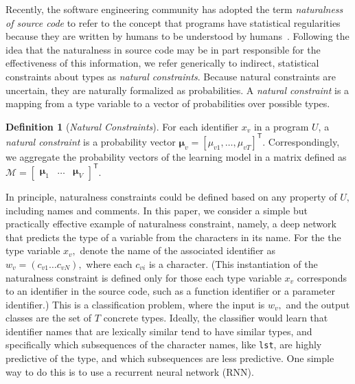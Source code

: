 \documentclass[sigplan,10pt,review,anonymous]{acmart}
\theoremstyle{plain}
\theoremstyle{remark}
\theoremstyle{definition}
\newtheorem{defn}{Definition}[section]
\begin{document}
Recently, the software engineering
community has adopted the term \emph{naturalness of source code} to refer to
the concept that programs have statistical regularities because
they are written by humans to be
understood by humans~\citep{hindle12}. 
Following the idea that the naturalness in source code may be in part responsible
for the effectiveness of this information, we 
refer generically to indirect, statistical
constraints about types as \emph{natural constraints}.
Because natural constraints are uncertain, they are naturally formalized
as probabilities.
A \emph{natural constraint} is a mapping from a type variable to a vector
of probabilities
over possible types.
\begin{defn}[\emph{Natural Constraints}]\label{eq:natural}
 For each identifier $x_v$ in a program $U$,
  a \emph{natural constraint} is a probability vector $\bm{\mu}_v = [\mu_{v1}, \ldots, \mu_{vT}]^\mathsf{T}$. Correspondingly, we aggregate the probability vectors of the learning model in a matrix defined as $\mathcal{M} = \begin{bmatrix} \bm{\mu}_1 & \ldots & \bm{\mu}_{V} \end{bmatrix}^\mathsf{T}$.
%
\end{defn}

In principle, naturalness constraints could be defined based on any property of $U,$
including names and comments.
In this paper, we consider a simple but practically effective example of
naturalness constraint, namely, a deep network that predicts the type
of a variable from the characters in its name.
For the the type variable $x_v,$ denote the name of the associated identifier as $w_v = (c_{v1} \ldots c_{vN}),$
where each $c_{vi}$ is a character.
(This instantiation of the naturalness constraint is defined
only for those each type variable $x_v$ corresponds to an identifier in the source code, 
such as a function identifier or a parameter identifier.)
This is a classification problem, where the input is $w_v,$
and the output classes are the set of $T$ concrete types.
Ideally, the classifier would learn that identifier names that are lexically similar
tend to have similar types, and specifically which subsequences of the character names,
like \texttt{lst}, are highly predictive of the type, and which subsequences are less predictive.
One simple way to do this is to use a recurrent neural network (RNN).
\end{document}
